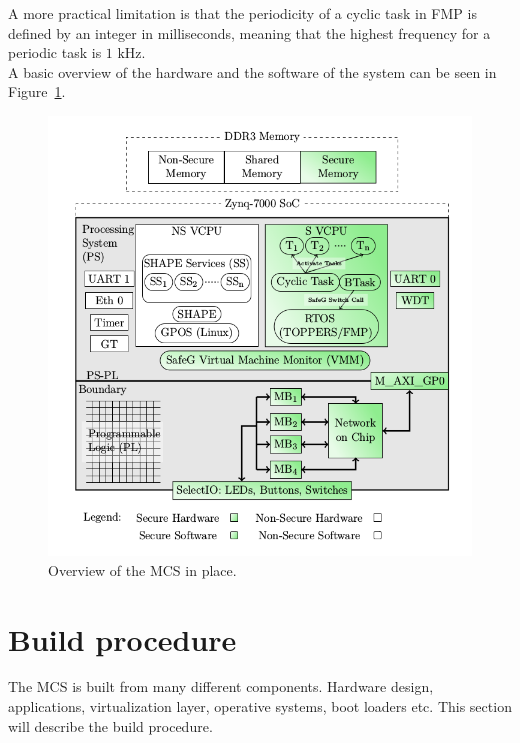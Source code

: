 A more practical limitation is that the periodicity of a cyclic task in FMP is defined by an integer in milliseconds, meaning that the highest frequency for a periodic task is $1\textrm{ kHz}$.\\

A basic overview of the hardware and the software of the system can be seen in Figure~\ref{fig:system_overview}.

\begin{figure}[H]
\centering
\includegraphics[width=\textwidth]{./img/system_overview.png}
\caption{Overview of the MCS in place.\cite{zaki2016}}\label{fig:system_overview}
\end{figure}

\section{Build procedure}
The MCS is built from many different components. Hardware design,  applications, virtualization layer, operative systems, boot loaders etc. This section will describe the build procedure.\\ %

